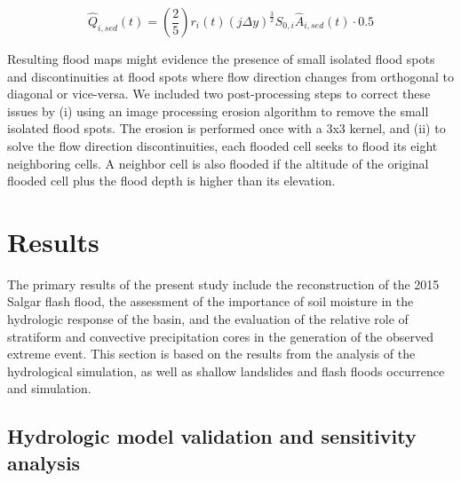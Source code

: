 \documentclass[hess, manuscript]{copernicus}
\begin{document}
 \begin{equation}
   \hat{Q}_{i,sed}(t) = \left( \frac{2}{5} \right) r_i(t)(j \Delta y)^{\frac{3}{2}} S_{0,i} \hat{A}_{i,sed}(t) \cdot 0.5
 \label{eq:constitutiva} 
 \end{equation}

Resulting flood maps might evidence the presence of small isolated flood spots and discontinuities at flood spots where flow direction changes from orthogonal to diagonal or vice-versa.  We included two post-processing steps to correct these issues by  (i) using an image processing erosion algorithm \citep{Serra1983} to remove the small isolated flood spots. The erosion is performed once with a 3x3 kernel, and (ii) to solve the flow direction discontinuities, each flooded cell seeks to flood its eight neighboring cells.  A neighbor cell is also flooded if the altitude of the original flooded cell plus the flood depth is higher than its elevation.

\section{Results}
\label{sec:results}

The primary results of the present study include the reconstruction of the 2015 Salgar flash flood, the assessment of the importance of soil moisture in the hydrologic response of the basin, and the evaluation of the relative role of stratiform and convective precipitation cores in the generation of the observed extreme event. This section is based on the results from the analysis of the hydrological simulation, as well as shallow landslides and flash floods occurrence and simulation. \\

\subsection{Hydrologic model validation and sensitivity analysis}
\end{document}

